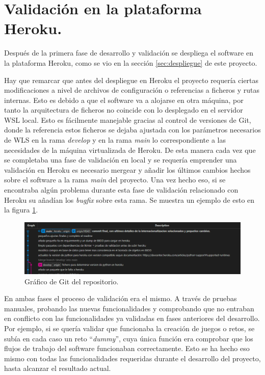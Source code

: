 \documentclass[a4paper, 12pt]{book}
\begin{document}
\section{Validación en la plataforma Heroku.}

Después de la primera fase de desarrollo y validación se despliega el software en la plataforma Heroku, como se vio en la sección \ref{sec:despliegue} de este proyecto. 

Hay que remarcar que antes del despliegue en Heroku el proyecto requería ciertas modificaciones a nivel de archivos de configuración o referencias a ficheros y rutas internas. Esto es debido a que el software va a alojarse en otra máquina, por tanto la arquitectura de ficheros no coincide con lo desplegado en el servidor WSL local. Esto es fácilmente manejable gracias al control de versiones de Git, donde la referencia estos ficheros se dejaba ajustada con los parámetros necesarios de WLS en la rama \emph{develop} y en la rama \emph{main} lo correspondiente a las necesidades de la máquina virtualizada de Heroku. De esta manera cada vez que se completaba una fase de validación en local y se requería emprender una validación en Heroku es necesario mergear y añadir los últimos cambios hechos sobre el software a la rama \emph{main} del proyecto. Una vez hecho eso, si se encontraba algún problema durante esta fase de validación relacionado con Heroku su añadían los \emph{bugfix} sobre esta rama. Se muestra un ejemplo de esto en la figura \ref{fig:git_graph.png}.

\begin{figure}
	\centering
	\includegraphics[width=16cm, keepaspectratio]{img/git_graph.png}
	\caption{Gráfico de Git del repositorio.}\label{fig:git_graph.png}
\end{figure}


En ambas fases el proceso de validación era el mismo. A través de pruebas manuales, probando las nuevas funcionalidades y comprobando que no entraban en conflicto con las funcionalidades ya validadas en fases anteriores del desarrollo. Por ejemplo, si se quería validar que funcionaba la creación de juegos o retos, se subía en cada caso un reto ``\emph{dummy}'', cuya única función era comprobar que los flujos de trabajo del software funcionaban correctamente. Esto se ha hecho eso mismo con todas las funcionalidades requeridas durante el desarrollo del proyecto, hasta alcanzar el resultado actual.
\end{document}
